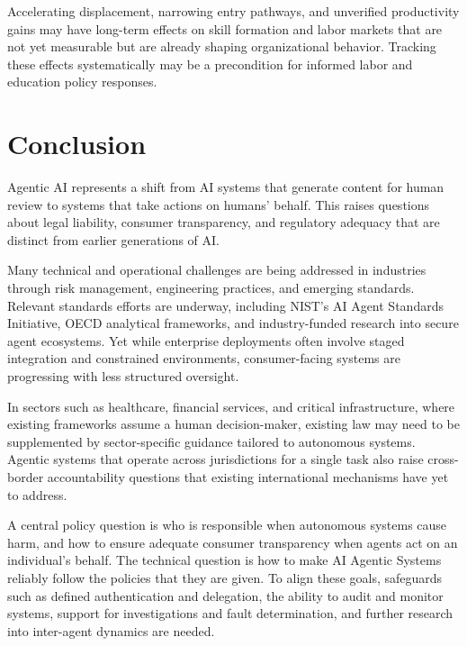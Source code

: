 \documentclass[acmlarge,nonacm,natbib=false]{acmart}
\begin{document}
\begin{techbriefbody}
\begin{takeaway}[12bp]
Accelerating displacement, narrowing entry pathways, and unverified
productivity gains may have long-term effects on skill formation and
labor markets that are not yet measurable but are already shaping
organizational behavior. Tracking these effects systematically may be a
precondition for informed labor and education policy responses.
\end{takeaway}

\section*{Conclusion}

Agentic AI represents a shift from AI systems that generate content for
human review to systems that take actions on humans' behalf. This raises
questions about legal liability, consumer transparency, and regulatory
adequacy that are distinct from earlier generations of AI.

Many technical and operational challenges are being addressed in
industries through risk management, engineering practices, and emerging
standards. Relevant standards efforts are underway, including NIST's AI
Agent Standards Initiative, OECD analytical frameworks, and
industry-funded research into secure agent ecosystems.\cite{nist2026caisi}
Yet while enterprise deployments often involve staged integration and
constrained environments, consumer-facing systems are progressing with
less structured oversight.

In sectors such as healthcare, financial services, and critical
infrastructure, where existing frameworks assume a human decision-maker,
existing law may need to be supplemented by sector-specific guidance
tailored to autonomous systems. Agentic systems that operate across
jurisdictions for a single task also raise cross-border accountability
questions that existing international mechanisms have yet to address.

A central policy question is who is responsible when autonomous systems
cause harm, and how to ensure adequate consumer transparency when agents
act on an individual's behalf. The technical question is how to make AI
Agentic Systems reliably follow the policies that they are given. To
align these goals, safeguards such as defined authentication and
delegation, the ability to audit and monitor systems, support for
investigations and fault determination, and further research into
inter-agent dynamics are needed.\cite{schmidt2025secure}
\end{techbriefbody}

\techbriefbackpage
\printbibliography
\end{document}

